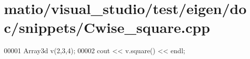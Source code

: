 \hypertarget{matio_2visual__studio_2test_2eigen_2doc_2snippets_2_cwise__square_8cpp_source}{}\section{matio/visual\+\_\+studio/test/eigen/doc/snippets/\+Cwise\+\_\+square.cpp}
\label{matio_2visual__studio_2test_2eigen_2doc_2snippets_2_cwise__square_8cpp_source}

\begin{DoxyCode}
00001 Array3d v(2,3,4);
00002 cout << v.square() << endl;
\end{DoxyCode}
